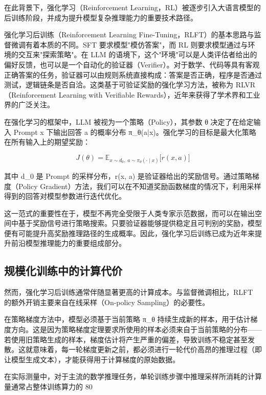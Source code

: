 在此背景下，强化学习（Reinforcement Learning，RL）被逐步引入大语言模型的后训练阶段，并成为提升模型复杂推理能力的重要技术路径。

强化学习后训练（Reinforcement Learning Fine-Tuning，RLFT）的基本思路与监督微调有着本质的不同。SFT 要求模型"模仿答案"，而 RL 则要求模型通过与环境的交互来"探索策略"。在 LLM 的语境下，这个"环境"可以是人类评估者给出的偏好反馈，也可以是一个自动化的验证器（Verifier）。对于数学、代码等具有客观正确答案的任务，验证器可以由规则系统直接构成：答案是否正确，程序是否通过测试，逻辑链条是否自洽。这类基于可验证奖励的强化学习方法，被称为 RLVR（Reinforcement Learning with Verifiable Rewards），近年来获得了学术界和工业界的广泛关注。

在强化学习的框架中，LLM 被视为一个策略（Policy），其参数 θ 决定了在给定输入 Prompt x 下输出回答 a 的概率分布 π_θ(a|x)。强化学习的目标是最大化策略在所有输入上的期望奖励：

\begin{equation}
\label{eq:rlvr_objective}
J(\theta) = \mathbb{E}_{x \sim d_0,\; a \sim \pi_{\theta}(\cdot\mid x)}\bigl[r(x,a)\bigr]
\end{equation}

其中 d_0 是 Prompt 的采样分布，r(x, a) 是验证器给出的奖励信号。通过策略梯度（Policy Gradient）方法，我们可以在不知道奖励函数梯度的情况下，利用采样得到的回答对模型参数进行迭代优化。

这一范式的重要性在于，模型不再完全受限于人类专家示范数据，而可以在输出空间中基于奖励信号进行策略搜索。只要验证器能够提供稳定且可判别的奖励，模型便有可能提升高奖励推理路径的生成概率。因此，强化学习后训练已成为近年来提升前沿模型推理能力的重要组成部分。

\subsection{规模化训练中的计算代价}

然而，强化学习后训练通常伴随显著更高的计算成本。与监督微调相比，RLFT 的额外开销主要来自在线采样（On-policy Sampling）的必要性。

在策略梯度方法中，模型必须基于当前策略 π_θ 持续生成新的样本，用于估计梯度方向。这是因为策略梯度定理要求所使用的样本必须来自于当前策略的分布——若使用旧策略生成的样本，梯度估计将产生严重的偏差，导致训练不稳定甚至发散。这就意味着，每一轮梯度更新之前，都必须进行一轮代价高昂的推理过程（即让模型生成文本），才能获得用于计算梯度的原始数据。

在实际测量中，对于主流的数学推理任务，单轮训练步骤中推理采样所消耗的计算量通常占整体训练算力的 80%

